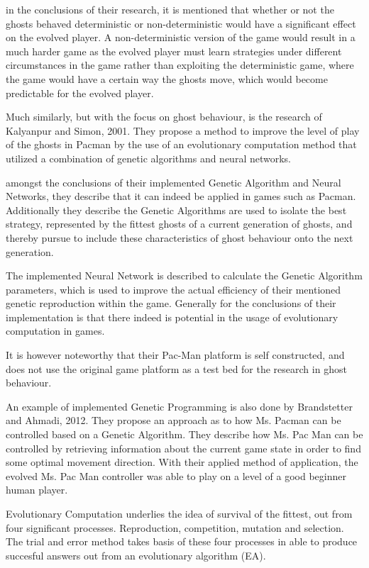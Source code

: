 in the conclusions of their research, it is mentioned that whether or not the ghosts behaved deterministic or non-deterministic would have a significant effect on the evolved player. A non-deterministic version of the game would result in a much harder game  as the evolved player must learn strategies under different circumstances in the game rather than exploiting the deterministic game, where the game would have a certain way the ghosts move, which would become predictable for the evolved player.\cite[pp. 8]{Lucas2005}

Much similarly, but with the focus on ghost behaviour, is the research of Kalyanpur and Simon, 2001. They propose a method to improve the level of play of the ghosts in Pacman by the use of an evolutionary computation method that utilized a combination of genetic algorithms and neural networks. \cite{Kalyanpur2001}

amongst the conclusions of their implemented Genetic Algorithm and Neural Networks, they describe that it can indeed be applied in games such as Pacman. Additionally they describe the Genetic Algorithms are used to isolate the best strategy, represented by the fittest ghosts of a current generation of ghosts, and thereby pursue to include these characteristics of ghost behaviour onto the next generation. \cite[pp. 8]{Kalyanpur2001}

The implemented Neural Network is described to calculate the Genetic Algorithm parameters, which is used to improve the actual efficiency of their mentioned genetic reproduction within the game. Generally for the conclusions of their implementation is that there indeed is potential in the usage of evolutionary computation in games.

It is however noteworthy that their Pac-Man platform is self constructed, and does not use the original game platform as a test bed for the research in ghost behaviour.

An example of implemented Genetic Programming is also done by Brandstetter and Ahmadi, 2012. They propose an approach as to how Ms. Pacman can be controlled based on a Genetic Algorithm.
They describe how Ms. Pac Man can be controlled by retrieving information about the current game state in order to find some optimal movement direction.
With their applied method of application, the evolved Ms. Pac Man controller was able to play on a level of a good beginner human player. \cite{Brandstetter2012}



Evolutionary Computation underlies the idea of survival of the fittest, out from four significant processes.
Reproduction, competition, mutation and selection. \cite{Fogel1997} The trial and error method takes basis of these four processes in able to produce succesful answers out from an evolutionary algorithm (EA).



